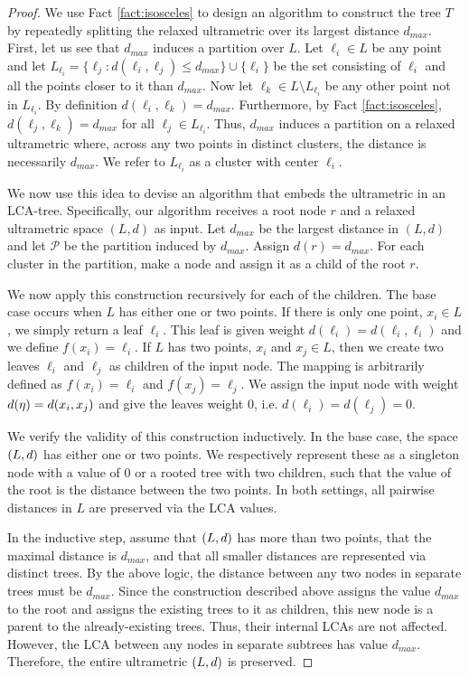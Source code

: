 \begin{proof}

    We use Fact \ref{fact:isosceles} to design an algorithm to construct the tree $T$ by repeatedly splitting the relaxed ultrametric over its largest distance $d_{max}$. First, let us see that $d_{max}$ induces a partition over $L$. Let $\ell_i \in L$ be any point and let $L_{\ell_i} = \{ \ell_j : d(\ell_i, \ell_j) \leq d_{max} \} \cup \{\ell_i\}$ be the set consisting of $\ell_i$ and all the points closer to it than $d_{max}$. Now let $\ell_k \in L \setminus L_{\ell_i}$ be any other point not in $L_{\ell_i}$. By definition $d(\ell_i, \ell_k) = d_{max}$. Furthermore, by Fact \ref{fact:isosceles}, $d(\ell_j, \ell_k) = d_{max}$ for all $\ell_j \in L_{\ell_i}$. Thus, $d_{max}$ induces a partition on a relaxed ultrametric where, across any two points in distinct clusters, the distance is necessarily $d_{max}$. We refer to $L_{\ell_i}$ as a cluster with center $\ell_i$.
    
    We now use this idea to devise an algorithm that embeds the ultrametric in an LCA-tree. Specifically, our algorithm receives a root node $r$ and a relaxed ultrametric space $(L, d)$ as input. Let $d_{max}$ be the largest distance in $(L, d)$ and let $\mathcal{P}$ be the partition induced by $d_{max}$. Assign $d(r) = d_{max}$. For each cluster in the partition, make a node and assign it as a child of the root $r$.
    
    We now apply this construction recursively for
    each of the children. The base case occurs when $L$ has either one or two points. If there is only one point, $x_i \in L$, we simply return a leaf $\ell_i$. This
    leaf is given weight $d(\ell_i) = d(\ell_i, \ell_i)$ and we define $f(x_i) = \ell_i$. If $L$ has two points, $x_i$ and $x_j \in L$, then we create two leaves $\ell_i$ and
    $\ell_j$ as children of the input node. The mapping is arbitrarily defined as $f(x_i) = \ell_i$ and $f(x_j) = \ell_j$. We assign the input node with weight
    $d(\eta) = d(x_i, x_j)$ and give the leaves weight $0$, i.e. $d(\ell_i) = d(\ell_j) = 0$.

    We verify the validity of this construction inductively. In the base case, the space $(L, d)$ has either one or two points. We respectively represent
    these as a singleton node with a value of 0 or a rooted tree with two children, such that the value of the root is the distance between the two points. In both
    settings, all pairwise distances in $L$ are preserved via the LCA values.

    In the inductive step, assume that $(L, d)$ has more than two points, that the maximal distance is $d_{max}$, and that all smaller distances are
    represented via distinct trees. By the above logic, the distance between any two nodes in separate trees must be $d_{max}$. Since the construction described above assigns the value $d_{max}$ to the root and assigns the existing trees to it as children, this new node is a parent
    to the already-existing trees. Thus, their internal LCAs are not affected. However, the LCA between any nodes in separate subtrees has value $d_{max}$. Therefore,
    the entire ultrametric $(L, d)$ is preserved.

\end{proof}

